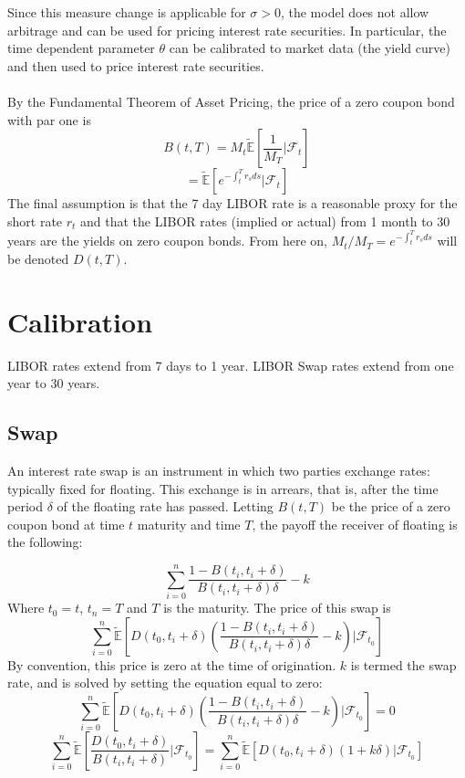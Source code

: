 \documentclass{article}
\theoremstyle{definition}
\begin{document}
Since this measure change is applicable for \(\sigma>0\), the model does not allow arbitrage and can be used for pricing interest rate securities. In particular, the time dependent parameter \(\theta\) can be calibrated to market data (the yield curve) and then used to price interest rate securities.  
\\
\\
By the Fundamental Theorem of Asset Pricing, the price of a zero coupon bond with par one is \[B(t, T)=M_t\mathbb{\tilde{E}}\left[\frac{1}{M_T}|\mathcal{F}_t \right]\] \[=\mathbb{\tilde{E}}\left[e^{-\int_t ^ T r_s ds}|\mathcal{F}_t \right]\]  The final assumption is that the 7 day LIBOR rate is a reasonable proxy for the short rate \(r_t\) and that the LIBOR rates (implied or actual) from 1 month to 30 years are the yields on zero coupon bonds.  From here on, \(M_t/M_T=e^{-\int_t ^ T r_s ds}\) will be denoted \(D(t, T)\). 

\section{Calibration}
LIBOR rates extend from 7 days to 1 year.  LIBOR Swap rates extend from one year to 30 years. 

\subsection{Swap}

An interest rate swap is an instrument in which two parties exchange rates: typically fixed for floating.  This exchange is in arrears, that is, after the time period \(\delta\) of the floating rate has passed.  Letting \(B(t, T)\) be the price of a zero coupon bond at time \(t\) maturity and time \(T\), the payoff the receiver of floating is the following:

\[\sum_{i=0} ^ n \frac{1-B(t_i, t_i+\delta)}{B(t_i, t_i+\delta)\delta}-k\]
Where \(t_0=t\), \(t_n=T\) and \(T\) is the maturity. The price of this swap is
\[\sum_{i=0}^n \mathbb{\tilde{E}}\left[D(t_0, t_i+\delta)\left(\frac{1-B(t_i, t_i+\delta)}{B(t_i, t_i+\delta)\delta}-k\right)|\mathcal{F}_{t_0}\right]\]
By convention, this price is zero at the time of origination.  \(k\) is termed the swap rate, and is solved by setting the equation equal to zero:
\[\sum_{i=0}^n \mathbb{\tilde{E}}\left[D(t_0, t_i+\delta)\left(\frac{1-B(t_i, t_i+\delta)}{B(t_i, t_i+\delta)\delta}-k\right)|\mathcal{F}_{t_0}\right]=0\]
\[\sum_{i=0}^n \mathbb{\tilde{E}}\left[\frac{D(t_0, t_i+\delta)}{B(t_i, t_i+\delta)}|\mathcal{F}_{t_0}\right]=\sum_{i=0}^n \mathbb{\tilde{E}}\left[D(t_0, t_i+\delta)\left(1+k\delta\right)|\mathcal{F}_{t_0}\right]\]
\end{document}
